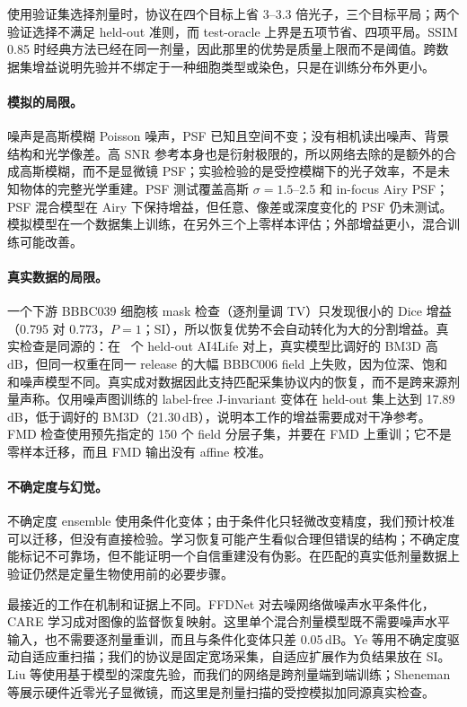 \documentclass[11pt]{ctexart}
\begin{document}
使用验证集选择剂量时，协议在四个目标上省 3--3.3 倍光子，三个目标平局；两个验证选择不满足 held-out 准则，而 test-oracle 上界是五项节省、四项平局。SSIM 0.85 时经典方法已经在同一剂量，因此那里的优势是质量上限而不是阈值。跨数据集增益说明先验并不绑定于一种细胞类型或染色，只是在训练分布外更小。

\paragraph{模拟的局限。}
噪声是高斯模糊 Poisson 噪声，PSF 已知且空间不变；没有相机读出噪声、背景结构和光学像差。高 SNR 参考本身也是衍射极限的，所以网络去除的是额外的合成高斯模糊，而不是显微镜 PSF；实验检验的是受控模糊下的光子效率，不是未知物体的完整光学重建。PSF 测试覆盖高斯 $\sigma=1.5$--2.5 和 in-focus Airy PSF；PSF 混合模型在 Airy 下保持增益，但任意、像差或深度变化的 PSF 仍未测试。模拟模型在一个数据集上训练，在另外三个上零样本评估；外部增益更小，混合训练可能改善。

\paragraph{真实数据的局限。}
一个下游 BBBC039 细胞核 mask 检查（逐剂量调 TV）只发现很小的 Dice 增益（0.795 对 0.773，$P=1$；SI），所以恢复优势不会自动转化为大的分割增益。真实检查是同源的：在 \RealN\ 个 held-out AI4Life 对上，真实模型比调好的 BM3D 高 \RealGain\,dB，但同一权重在同一 release 的大幅 BBBC006 field 上失败，因为位深、饱和和噪声模型不同。真实成对数据因此支持匹配采集协议内的恢复，而不是跨来源剂量声称。仅用噪声图训练的 label-free J-invariant 变体\cite{batson2019noise2self}在 held-out 集上达到 17.89\,dB，低于调好的 BM3D（21.30\,dB），说明本工作的增益需要成对干净参考。FMD 检查使用预先指定的 150 个 field 分层子集，并要在 FMD 上重训；它不是零样本迁移，而且 FMD 输出没有 affine 校准。

\paragraph{不确定度与幻觉。}
不确定度 ensemble 使用条件化变体；由于条件化只轻微改变精度，我们预计校准可以迁移，但没有直接检验。学习恢复可能产生看似合理但错误的结构\cite{blau2018perception}；不确定度能标记不可靠场，但不能证明一个自信重建没有伪影。在匹配的真实低剂量数据上验证仍然是定量生物使用前的必要步骤。

最接近的工作在机制和证据上不同。FFDNet 对去噪网络做噪声水平条件化，CARE 学习成对图像的监督恢复映射。这里单个混合剂量模型既不需要噪声水平输入，也不需要逐剂量重训，而且与条件化变体只差 0.05\,dB。Ye 等\cite{ye2025uncertainty}用不确定度驱动自适应重扫描；我们的协议是固定宽场采集，自适应扩展作为负结果放在 SI。Liu 等\cite{liu2020degeneration}使用基于模型的深度先验，而我们的网络是跨剂量端到端训练；Sheneman 等\cite{sheneman2025nearzero}展示硬件近零光子显微镜，而这里是剂量扫描的受控模拟加同源真实检查。
\end{document}
